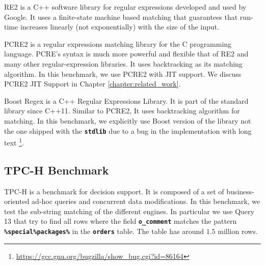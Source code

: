 RE2 \cite{re2} is a C++ software library for regular expressions developed and used by Google. It uses a finite-state machine based matching that guarantees that run-time increases linearly (not exponentially) with the size of the input.

PCRE2 \cite{pcre2} is a regular expressions matching library for the C programming language. PCRE's syntax is much more powerful and flexible that of RE2 and many other regular-expression libraries. It uses backtracking as its matching algorithm. In this benchmark, we use PCRE2 with JIT support. We discuss PCRE2 JIT Support in Chapter \ref{chapter:related_work}.

Boost Regex \cite{Boost} is a C++ Regular Expressions Library. It is part of the standard library since C++11. Similar to PCRE2, It uses backtracking algorithm for matching. In this benchmark, we explicitly use Boost version of the library not the one shipped with the \texttt{\textbf{stdlib}} due to a bug in the implementation with long text \footnote{\url{https://gcc.gnu.org/bugzilla/show\_bug.cgi?id=86164}}.

\subsection{TPC-H Benchmark}
TPC-H \cite{tpch} is a benchmark for decision support. It is composed of a set of business-oriented ad-hoc queries and concurrent data modifications.
In this benchmark, we test the sub-string matching of the different engines. In particular we use Query 13 that try to find all rows where the field \texttt{\textbf{o\_comment}} matches the pattern \texttt{\textbf{\%special\%packages\%}} in the \texttt{\textbf{orders}} table. The table has around $1.5$ million rows.

